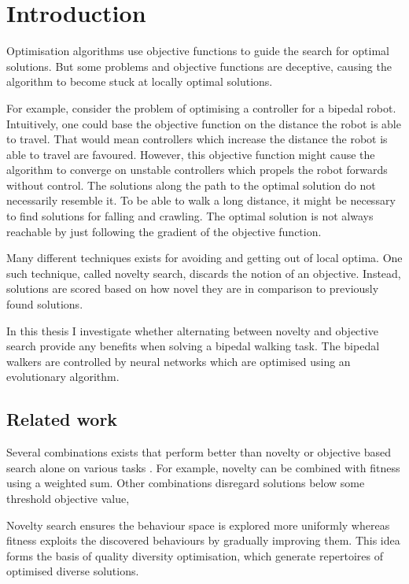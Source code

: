 \section{Introduction}

\label{sec:intro}

Optimisation algorithms use objective functions to guide the search for optimal solutions.
But some problems and objective functions are deceptive, causing the algorithm to become stuck at
locally optimal solutions.

For example, consider the problem of optimising a controller for a bipedal
robot. Intuitively, one could base the objective function on the distance the robot is able to travel.
That would mean controllers which increase the distance the robot is able to travel are favoured.
However, this objective function might cause the algorithm to converge on unstable controllers which
propels the robot forwards without control. The solutions along the path to the optimal solution
do not necessarily resemble it. To be able to walk a long distance, it might be necessary to find
solutions for falling and crawling. The optimal solution is not always reachable by just
following the gradient of the objective function.

Many different techniques exists for avoiding and getting out of local optima. One such technique, called
novelty search, discards the notion of an objective. Instead, solutions are scored based on how novel
they are in comparison to previously found solutions.

In this thesis I investigate whether alternating between novelty and objective search provide any
benefits when solving a bipedal walking task. The bipedal walkers are controlled by neural networks
which are optimised using an evolutionary algorithm.

\todo{}


\subsection{Related work}
Several combinations exists that perform better than novelty or objective based search alone
on various tasks \cite{ns_study}. For example, novelty
can be combined with fitness using a weighted sum. Other combinations disregard solutions
below some threshold objective value,


Novelty search ensures the behaviour space is explored more uniformly whereas fitness exploits the discovered behaviours
by gradually improving them. This idea forms the basis of quality diversity optimisation,
which generate repertoires of optimised diverse solutions.


